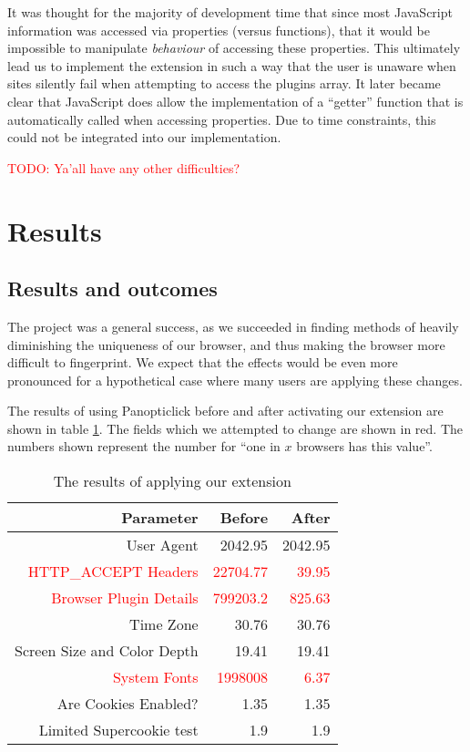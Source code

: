 \documentclass[12pt,a4paper]{article}
\begin{document}
It was thought for the majority of development time that since most JavaScript information was accessed via properties (versus functions), that it would be impossible to manipulate \textit{behaviour} of accessing these properties. This ultimately lead us to implement the extension in such a way that the user is unaware when sites silently fail when attempting to access the plugins array. It later became clear that JavaScript does allow the implementation of a ``getter'' function that is automatically called when accessing properties. Due to time constraints, this could not be integrated into our implementation.

\textcolor{red}{TODO: Ya'all have any other difficulties?}

\section{Results}
\subsection{Results and outcomes}
\label{subsec:results}
The project was a general success, as we succeeded in finding methods of heavily diminishing the uniqueness of our browser, and thus making the browser more difficult to fingerprint. We expect that the effects would be even more pronounced for a hypothetical case where many users are applying these changes.

The results of using Panopticlick before and after activating our extension are shown in table \ref{tab:resultTable}. The fields which we attempted to change are shown in red. The numbers shown represent the number for ``one in $x$ browsers has this value''.

\begin{table}[h]
	\centering
	\begin{tabular}{|r|r|r|}
		\hline
		\textbf{Parameter} & \textbf{Before} & \textbf{After} \\
		\hline
		User Agent & 2042.95 & 2042.95 \\
		\textcolor{red}{HTTP\_ACCEPT Headers} & \textcolor{red}{22704.77} & \textcolor{red}{39.95} \\
		\textcolor{red}{Browser Plugin Details} & \textcolor{red}{799203.2} & \textcolor{red}{825.63} \\
		Time Zone & 30.76 & 30.76 \\
		Screen Size and Color Depth & 19.41 & 19.41 \\
		\textcolor{red}{System Fonts} & \textcolor{red}{1998008} & \textcolor{red}{6.37} \\
		Are Cookies Enabled? & 1.35 & 1.35 \\
		Limited Supercookie test & 1.9 & 1.9 \\
		\hline
	\end{tabular}
	\caption{The results of applying our extension}
 	\label{tab:resultTable}
\end{table}
\end{document}
